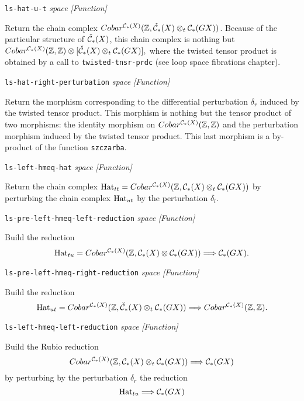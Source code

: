 {{{\tt ls-hat-u-t} {\em space}  \hfill {\em [Function]} \par}
{\leftskip=15mm
Return the chain complex
$Cobar^{{\cal C}_*(X)}({{\Bbb Z}},{\check{\cal C}}_*(X)\otimes_t {\cal C_*}(GX))$. Because of
the particular structure of ${\check{\cal C}}_*(X)$, this chain complex is nothing but
$Cobar^{{\cal C}_*(X)}({{\Bbb Z}},{{\Bbb Z}})\otimes[{\check{\cal C}}_*(X)\otimes_t {\cal C_*}(GX)],$
where the twisted tensor product is obtained by a call to {\tt twisted-tnsr-prdc} 
(see loop space fibrations chapter). \par}
{\leftskip=5mm
{\tt ls-hat-right-perturbation} {\em space}  \hfill {\em [Function]} \par}
{\leftskip=15mm
Return the morphism corresponding to the differential perturbation $\delta_r$ induced
by the twisted tensor product. This morphism is nothing but the tensor product of two
morphisms: the identity morphism on $Cobar^{{\cal C}_*(X)}({{\Bbb Z}},{{\Bbb Z}})$ and 
the perturbation morphism induced by the twisted tensor product. This last 
morphism is a by-product of the function {\tt szczarba}. \par}
{\leftskip=5mm
{\tt ls-left-hmeq-hat} {\em space}  \hfill {\em [Function]} \par}
{\leftskip=15mm
Return the chain complex 
${\rm Hat}_{tt}=Cobar^{{\cal C}_*(X)}({{\Bbb Z}}, {\cal C}_*(X)\otimes_t {\cal C_*}(GX))$ by 
perturbing the chain complex ${\rm Hat}_{ut}$ by the perturbation $\delta_l$. \par}
{\leftskip=5mm
{\tt ls-pre-left-hmeq-left-reduction} {\em space}  \hfill {\em [Function]} \par}
{\leftskip=15mm
Build the reduction
$${\rm Hat}_{tu}=Cobar^{{\cal C}_*(X)}({{\Bbb Z}}, {\cal C}_*(X)\otimes {\cal C_*}(GX)) \Longrightarrow {\cal C}_*(GX).$$ 
\par}
{\leftskip=5mm
{\tt ls-pre-left-hmeq-right-reduction} {\em space}  \hfill {\em [Function]} \par}
{\leftskip=15mm
Build the reduction
$${\rm Hat}_{ut}=Cobar^{{\cal C}_*(X)}({{\Bbb Z}},{\check{\cal C}}_*(X)\otimes_t {\cal C_*}(GX)) \Longrightarrow
Cobar^{{\cal C}_*(X)}({{\Bbb Z}}, {{\Bbb Z}}).$$ \par}
{\leftskip=5mm
{\tt ls-left-hmeq-left-reduction} {\em space}  \hfill {\em [Function]} \par}
{\leftskip=15mm
Build the Rubio reduction 
$$Cobar^{{\cal C}_*(X)}({{\Bbb Z}}, {\cal C}_*(X)\otimes_t {\cal C_*}(GX)) \Longrightarrow{\cal C}_*(GX)$$
by perturbing by the perturbation $\delta_r$ the reduction
$${\rm Hat}_{tu} \Longrightarrow {\cal C}_*(GX)$$ 
}}
